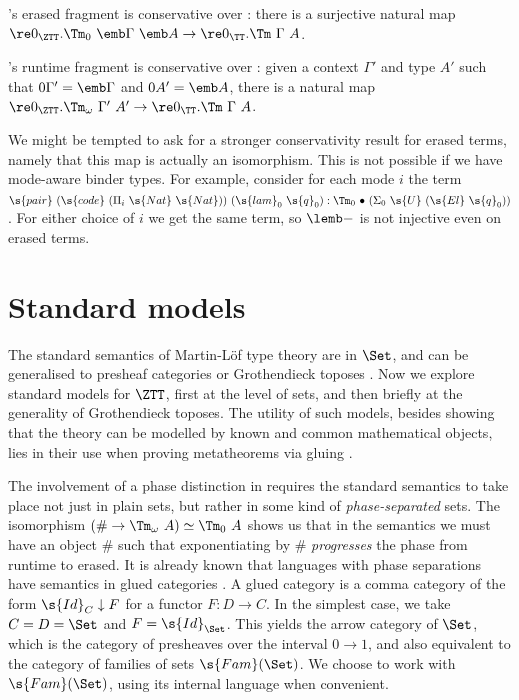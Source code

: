 \begin{theorem}\label{thm:erased-cons}
  \ZTT's erased fragment is conservative over \TT: there is a surjective natural map
  $\re 0_{\ZTT}.\Tm_0\ \emb \Gamma\ \emb A \to \re 0_\TT.\Tm\ \Gamma\ A$.
\end{theorem}

\begin{corollary}\label{thm:rt-cons}
  \ZTT's runtime fragment is conservative over \TT: given a \ZTT context $\Gamma'$
  and type $A'$ such that $0\Gamma' = \emb \Gamma$ and $0A' = \emb A$, there is a natural map
  $\re 0_{\ZTT}.\Tm_\omega\ \Gamma'\ A' \to \re 0_\TT.\Tm\ \Gamma\ A$.
\end{corollary}

We might be tempted to ask for a stronger conservativity result for erased
terms, namely that this map is actually an isomorphism. This is not possible if
we have mode-aware binder types. For example, consider for each mode $i$ the
term $\s{pair}\ (\s{code}\ (\Pi_i\ \s{Nat}\ \s{Nat}))\ (\s{lam}_0\ \s{q}_0) :
\Tm_0\ {\bullet}\ (\Sigma_0\ \s{U}\ (\s{El}\ \s{q}_0))$. For either choice of
$i$ we get the same \TT term, so $\lemb-$ is not injective even on erased terms.

\section{Standard models} \label{ssub:std-model}

The standard semantics of Martin-L\"of type theory are in $\Set$, and can be
generalised to presheaf categories \cite{Hofmann1997-on} or Grothendieck toposes
\cite{Gratzer2022-gn}. Now we explore standard models for $\ZTT$, first at the
level of sets, and then briefly at the generality of Grothendieck toposes.
The utility of such models, besides showing that the theory can be modelled by known
and common mathematical objects, lies in their use when proving metatheorems
via gluing \cite{Kaposi2019-lp}.

The involvement of a phase distinction in \ZTT requires the standard semantics
to take place not just in plain sets, but rather in some kind of
\emph{phase-separated} sets. The isomorphism $(\# \to \Tm_\omega\ A) \simeq
\Tm_0\ A$ shows us that in the semantics we must have an object $\#$ such that
exponentiating by $\#$ \emph{progresses} the phase from runtime to erased. It is
already known that languages with phase separations have semantics in
glued categories \cite{Sterling2022-ym}. A glued category is a comma category of
the form $\s{Id}_C \downarrow F$ for a functor $F : D \to C$. In the simplest
case, we take $C = D = \Set$ and $F = \s{Id}_{\Set}$. This yields the arrow
category of $\Set$, which is the category of presheaves over the interval $0 \to
1$, and also equivalent to the category of families of sets $\s{Fam}(\Set)$.
We choose to work with $\s{Fam}(\Set)$, using its internal language when convenient.

